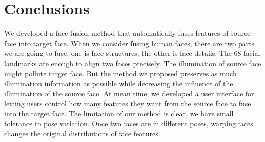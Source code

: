 \section{Conclusions}

We developed a face fusion method that automatically fuses features of source face into target face. When we consider fusing human faces, there are two parts we are going to fuse, one is face structures, the other is face details. The 68 facial landmarks are enough to align two faces precisely. The illumination of source face might pollute target face. But the method we proposed preserves as much illumination information as possible while decreasing the influence of the illumination of the source face. At mean time, we developed a user interface for letting users control how many features they want from the source face to fuse into the target face. The limitation of our method is clear, we have small tolerance to pose variation. Once two faces are in different poses, warping faces changes the original distributions of face features. 